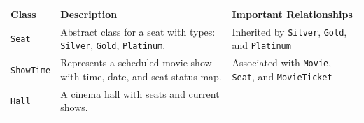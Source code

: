 \begin{center}
{\def\LTcaptype{none} %
\begin{longtable}[]{@{}
>{\raggedright\arraybackslash} p{}
>{\raggedright\arraybackslash} p{}
>{\raggedright\arraybackslash} p{}@{}}
\toprule\noalign{}
\endhead
\bottomrule\noalign{}
\endlastfoot
\begin{minipage}[t]{\linewidth}\raggedright
\textbf{Class}
\end{minipage} & \begin{minipage}[t]{\linewidth}\raggedright
\textbf{Description}
\end{minipage} & \begin{minipage}[t]{\linewidth}\raggedright
\textbf{Important Relationships}
\end{minipage} \\
\begin{minipage}[t]{\linewidth}\raggedright
\texttt{Seat}
\end{minipage} & \begin{minipage}[t]{\linewidth}\raggedright
Abstract class for a seat with types: \texttt{Silver}, \texttt{Gold}, \texttt{Platinum}.
\end{minipage} & \begin{minipage}[t]{\linewidth}\raggedright
Inherited by \texttt{Silver}, \texttt{Gold}, and \texttt{Platinum}
\end{minipage} \\
\begin{minipage}[t]{\linewidth}\raggedright
\texttt{ShowTime}
\end{minipage} & \begin{minipage}[t]{\linewidth}\raggedright
Represents a scheduled movie show with time, date, and seat status map.
\end{minipage} & \begin{minipage}[t]{\linewidth}\raggedright
Associated with \texttt{Movie}, \texttt{Seat}, and \texttt{MovieTicket}
\end{minipage} \\
\begin{minipage}[t]{\linewidth}\raggedright
\texttt{Hall}
\end{minipage} & \begin{minipage}[t]{\linewidth}\raggedright
A cinema hall with seats and current shows.
\end{minipage} & \begin{minipage}[t]{\linewidth}\raggedright

\end{minipage}
\end{longtable}}
\end{center}
